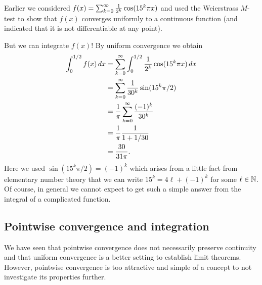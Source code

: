 \documentclass[10pt, a4paper]{article}
\newcommand{\infsumo}{\infsum[k = 0]}
\begin{document}
\begin{example}
    Earlier we considered $f(x) = \infsumo\frac{1}{2 ^ k}\cos(15 ^ k\pi x)$ and used the Weierstrass $M$-test to show that $f(x)$ converges uniformly to a continuous function
    (and indicated that it is not differentiable at any point).

    But we can integrate $f(x)$!
    By uniform convergence we obtain
    \begin{align*}
        \int_{0}^{1 / 2}f(x)\,dx &= \infsumo\int_{0}^{1 / 2}\frac{1}{2 ^ k}\cos(15 ^ k\pi x)\,dx \\
        &= \infsumo\frac{1}{30 ^ k}\sin(15 ^ k\pi / 2) \\
        &= \frac{1}{\pi}\infsumo\frac{(-1) ^ k}{30 ^ k} \\
        &= \frac{1}{\pi}\frac{1}{1 + 1 / 30} \\
        &= \frac{30}{31\pi}.
    \end{align*}
    Here we used $\sin(15 ^ k\pi / 2) = (-1) ^ k$ which arises from a little fact from elementary number theory that we can write $15 ^ k = 4\ell + (-1) ^ k$ for some $\ell \in \mathbb{N}$.
    Of course,
    in general we cannot expect to get such a simple answer from the integral of a complicated function.
\end{example}

\subsection{Pointwise convergence and integration}
We have seen that pointwise convergence does not necessarily preserve continuity and that uniform convergence is a better setting to establish limit theorems.
However,
pointwise convergence is too attractive and simple of a concept to not investigate its properties further.
\end{document}

